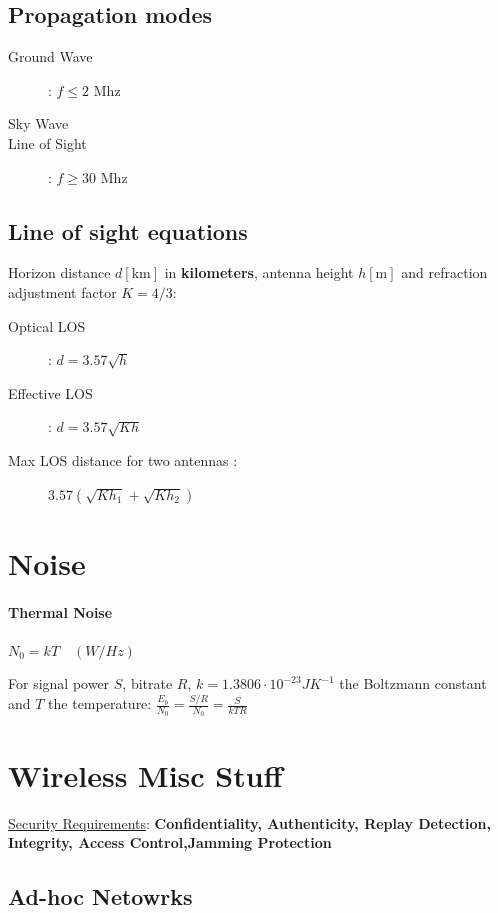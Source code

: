 \documentclass[10pt, a4paper,twocolumn]{scrartcl}
\begin{document}
\subsection{Propagation modes}
\begin{multicols}{2}
	\begin{description}
		\item[Ground Wave] : $f \le 2$ Mhz
		\item[Sky Wave]
		\item[Line of Sight] : $f \ge 30$ Mhz
	\end{description}
\end{multicols}

\subsection{Line of sight equations}
Horizon distance $d[\textrm{km}]$ in \textbf{kilometers}, antenna height $h[\textrm{m}]$ and refraction adjustment factor $K = 4/3$:
\begin{description}
\item[Optical LOS]: $d = 3.57\sqrt{h}$
\item[Effective LOS]: $d = 3.57\sqrt{Kh}$
\item[Max LOS distance for two antennas :] $3.57(\sqrt{Kh_1}+ \sqrt{Kh_2})$
\end{description}

\section{Noise}
\paragraph{Thermal Noise}$N_0 = kT\quad(W/Hz)$

For signal power $S$, bitrate $R$, $k = 1.3806\cdot10^{-23} JK^{-1}$ the Boltzmann constant and $T$ the temperature: $\frac{E_b}{N_0} = \frac{S/R}{N_0} = \frac{S}{kTR}$

\section{Wireless Misc Stuff}
\underline{Security Requirements}:
\textbf{Confidentiality, Authenticity, Replay Detection, Integrity, Access Control,Jamming Protection}

\subsection{Ad-hoc Netowrks} %
\end{document}
